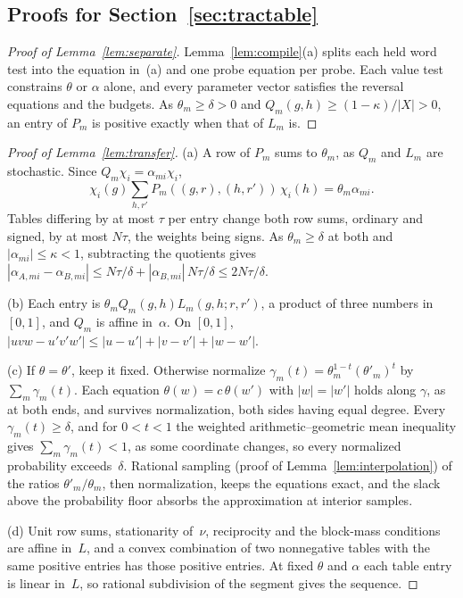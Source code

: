 \subsection{Proofs for Section~\ref{sec:tractable}}\label{app:tractable-proofs}

\begin{proof}[Proof of Lemma~\ref{lem:separate}]
Lemma~\ref{lem:compile}(a) splits each held word test into the equation
in~(a) and one probe equation per probe. Each value test constrains
$\theta$ or $\alpha$ alone, and every parameter vector satisfies the
reversal equations and the budgets. As $\theta_m\ge\delta>0$ and
$Q_m(g,h)\ge(1-\kappa)/|X|>0$, an entry of $P_m$ is positive exactly when
that of $L_m$ is.
\end{proof}

\begin{proof}[Proof of Lemma~\ref{lem:transfer}]
(a) A row of $P_m$ sums to $\theta_m$, as $Q_m$ and $L_m$ are stochastic.
Since $Q_m\chi_i=\alpha_{mi}\chi_i$,
\[
  \chi_i(g)\sum_{h,r'}P_m((g,r),(h,r'))\,\chi_i(h)=\theta_m\alpha_{mi}.
\]
Tables differing by at most $\tau$ per entry change both row sums,
ordinary and signed, by at most $N\tau$, the weights being signs. As
$\theta_m\ge\delta$ at both and $|\alpha_{mi}|\le\kappa<1$, subtracting the
quotients gives
$|\alpha_{A,mi}-\alpha_{B,mi}|\le N\tau/\delta+|\alpha_{B,mi}|\,N\tau/\delta
\le2N\tau/\delta$.

(b) Each entry is $\theta_mQ_m(g,h)L_m(g,h;r,r')$, a product of three
numbers in $[0,1]$, and $Q_m$ is affine in~$\alpha$. On $[0,1]$,
$|uvw-u'v'w'|\le|u-u'|+|v-v'|+|w-w'|$.

(c) If $\theta=\theta'$, keep it fixed. Otherwise normalize
$\gamma_m(t)=\theta_m^{1-t}(\theta'_m)^t$ by $\sum_m\gamma_m(t)$. Each
equation $\theta(w)=c\,\theta(w')$ with $|w|=|w'|$ holds along $\gamma$, as
at both ends, and survives normalization, both sides having equal degree.
Every $\gamma_m(t)\ge\delta$, and for $0<t<1$ the weighted
arithmetic--geometric mean inequality gives $\sum_m\gamma_m(t)<1$, as some
coordinate changes, so every normalized probability exceeds~$\delta$.
Rational sampling (proof of Lemma~\ref{lem:interpolation}) of the ratios
$\theta'_m/\theta_m$, then normalization, keeps the equations exact, and
the slack above the probability floor absorbs the approximation at interior samples.

(d) Unit row sums, stationarity of~$\nu$, reciprocity and the block-mass
conditions are affine in~$L$, and a convex combination of two nonnegative
tables with the same positive entries has those positive entries. At fixed
$\theta$ and $\alpha$ each table entry is linear in~$L$, so rational
subdivision of the segment gives the sequence.
\end{proof}

